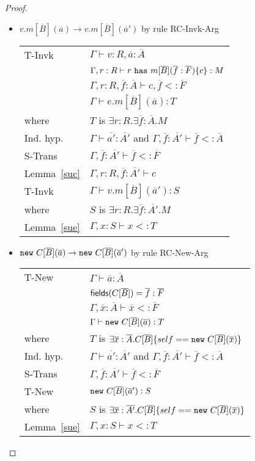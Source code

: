\documentclass[preprint,nocopyrightspace,9pt]{sigplanconf}
\begin{document}
\begin{proof}
\begin{itemize}
\item $v.m[\overline{B}](\overline{a}) \rightarrow v.m[\overline{B}](\overline{a}')$ by rule {\sc RC-Invk-Arg}
\\
\begin{tabular}{ll}
{\sc T-Invk} & $\Gamma\vdash v:R,\overline{a}:\overline{A}$
\\
& $\Gamma,r:R\vdash r~{\tt has}~m[\overline{B}](\overline{f}:\overline{F})\{c\}:M$
\\
& $\Gamma,r:R,\overline{f}:\overline{A}\vdash c,\overline{f}<:\overline{F}$
\\
& $\Gamma\vdash e.m[\overline{B}](\overline{a}):T$
\\
where & $T$ is $\exists r:R.\exists \overline{f}:\overline{A}.M$
\\
Ind. hyp. & $\Gamma\vdash \overline{a'}:\overline{A'}$ and $\Gamma,\overline{f}:\overline{A'}\vdash\overline{f}<:\overline{A}$
\\
{\sc S-Trans} & $\Gamma,\overline{f}:\overline{A'}\vdash\overline{f}<:\overline{F}$
\\
Lemma~\ref{suc} & $\Gamma,r:R,\overline{f}:\overline{A'}\vdash c$
\\
{\sc T-Invk} & $\Gamma\vdash v.m[\overline{B}](\overline{a}'):S$
\\
where & $S$ is $\exists r:R.\exists \overline{f}:\overline{A'}.M$
\\
Lemma~\ref{sue} & $\Gamma,x:S\vdash x<:T$
\end{tabular}


\item ${\tt new}~C[\overline{B}](\overline{a}) \rightarrow {\tt new}~C[\overline{B}](\overline{a}')$ by rule {\sc RC-New-Arg}
\\
\begin{tabular}{ll}
{\sc T-New} & $\Gamma\vdash\overline{a}:\overline{A}$
\\
& ${\sf fields}(C[\overline{B}])=\overline{f}:\overline{F}$
\\
& $\Gamma,\overline{x}:\overline{A}\vdash \overline{x}<:\overline{F}$
\\
& $\Gamma\vdash{\tt new}~C[\overline{B}](\overline{a}):T$
\\
where & $T$ is $\exists\overline{x}:\overline{A}.C[\overline{B}]\{self=={\tt new}~C[\overline{B}](\overline{x})\}$
\\
Ind. hyp. & $\Gamma\vdash \overline{a'}:\overline{A'}$ and $\Gamma,\overline{f}:\overline{A'}\vdash\overline{f}<:\overline{A}$
\\
{\sc S-Trans} & $\Gamma,\overline{f}:\overline{A'}\vdash\overline{f}<:\overline{F}$
\\
{\sc T-New} & ${\tt new}~C[\overline{B}](\overline{a}'):S$
\\
where & $S$ is $\exists\overline{x}:\overline{A'}.C[\overline{B}]\{self=={\tt new}~C[\overline{B}](\overline{x})\}$
\\
Lemma~\ref{sue} & $\Gamma,x:S\vdash x<:T$
\end{tabular}


\end{itemize}
\end{proof}
\end{document}
